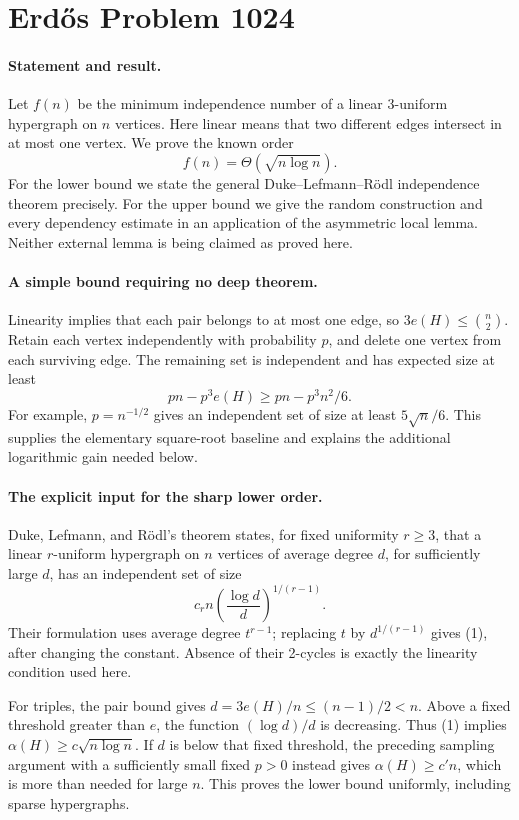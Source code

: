 \section*{Erd\H{o}s Problem 1024}

\paragraph{Statement and result.}
Let \(f(n)\) be the minimum independence number of a linear 3-uniform hypergraph on \(n\) vertices. Here linear means that two different edges intersect in at most one vertex. We prove the known order
\[
 f(n)=\Theta(\sqrt{n\log n}).
\]
For the lower bound we state the general Duke--Lefmann--R\"odl independence theorem precisely. For the upper bound we give the random construction and every dependency estimate in an application of the asymmetric local lemma. Neither external lemma is being claimed as proved here.

\paragraph{A simple bound requiring no deep theorem.}
Linearity implies that each pair belongs to at most one edge, so
\(3e(H)\leq\binom n2\). Retain each vertex independently with probability \(p\), and delete one vertex from each surviving edge. The remaining set is independent and has expected size at least
\[
 pn-p^3e(H)\geq pn-p^3n^2/6.
\]
For example, \(p=n^{-1/2}\) gives an independent set of size at least \(5\sqrt n/6\). This supplies the elementary square-root baseline and explains the additional logarithmic gain needed below.

\paragraph{The explicit input for the sharp lower order.}
Duke, Lefmann, and R\"odl's theorem states, for fixed uniformity \(r\geq3\), that a linear \(r\)-uniform hypergraph on \(n\) vertices of average degree \(d\), for sufficiently large \(d\), has an independent set of size
\[
 c_r n\left(\frac{\log d}{d}\right)^{1/(r-1)}. \tag{1}
\]
Their formulation uses average degree \(t^{r-1}\); replacing \(t\) by \(d^{1/(r-1)}\) gives (1), after changing the constant. Absence of their 2-cycles is exactly the linearity condition used here.

For triples, the pair bound gives \(d=3e(H)/n\leq(n-1)/2<n\). Above a fixed threshold greater than \(e\), the function \((\log d)/d\) is decreasing. Thus (1) implies
\(\alpha(H)\geq c\sqrt{n\log n}\).
If \(d\) is below that fixed threshold, the preceding sampling argument with a sufficiently small fixed \(p>0\) instead gives \(\alpha(H)\geq c'n\), which is more than needed for large \(n\). This proves the lower bound uniformly, including sparse hypergraphs.

